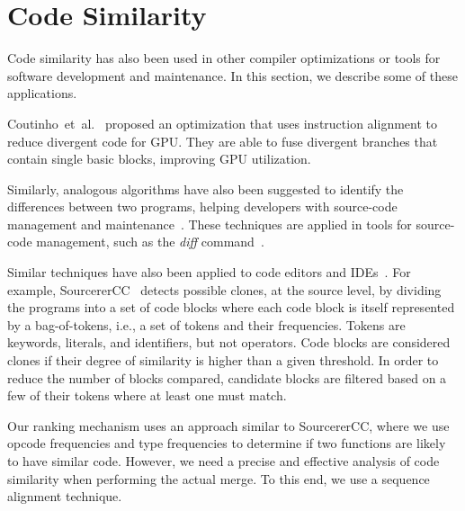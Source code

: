 
\section{Code Similarity}

Code similarity has also been used in other compiler optimizations or tools for
software development and maintenance.
In this section, we describe some of these applications.

Coutinho~et~al.~\cite{coutinho11} proposed an optimization that uses instruction
alignment to reduce divergent code for GPU.
They are able to fuse divergent branches that contain single basic blocks,
improving GPU utilization.

Similarly, analogous algorithms have also been suggested to identify the
differences between two programs, helping developers with source-code
management and maintenance~\cite{yang91,miller85}.
These techniques are applied in tools for source-code management, such as
the \textit{diff} command~\cite{miller85}.

Similar techniques have also been applied to code editors and IDEs~\cite{toomim04,sajnani16}.
For example,
SourcererCC~\cite{sajnani16} detects possible clones, at the source level, by
dividing the programs into a set of code blocks where each code block is itself
represented by a bag-of-tokens, i.e., a set of tokens and their frequencies.
Tokens are keywords, literals, and identifiers, but not operators.
Code blocks are considered clones if their degree of similarity is higher than
a given threshold.
In order to reduce the number of blocks compared, candidate blocks are filtered
based on a few of their tokens where at least one must match.

Our ranking mechanism uses an approach similar to SourcererCC, where we use
opcode frequencies and type frequencies to determine if two functions are
likely to have similar code.
However, we need a precise and effective analysis of code similarity when
performing the actual merge.
To this end, we use a sequence alignment technique.

